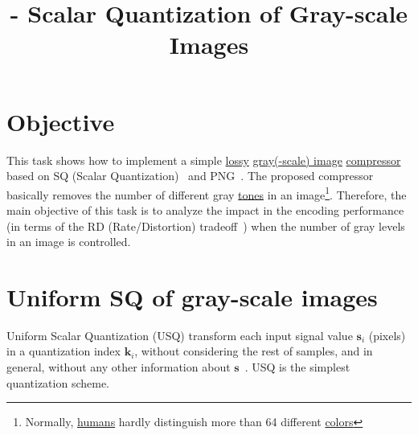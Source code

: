 

\title{\SM{} - Scalar Quantization of Gray-scale Images}

\maketitle
\tableofcontents

\section{Objective}
This task shows how to implement a simple
\href{https://en.wikipedia.org/wiki/Lossy_compression}{lossy}
\href{https://en.wikipedia.org/wiki/Grayscale}{gray(-scale) image}
\href{https://en.wikipedia.org/wiki/Image_compression}{compressor}~\cite{vruiz__image_IO}
based on SQ (Scalar
Quantization)~\cite{vruiz__scalar_quantization,sayood2017introduction,vetterli2014foundations}
and PNG~\cite{vruiz__PNG}. The proposed compressor basically removes
the number of different gray
\href{https://en.wikipedia.org/w/index.php?title=Tone_(color)&redirect=no}{tones}
in an image\footnote{Normally,
\href{https://en.wikipedia.org/wiki/Visual_system}{humans} hardly
distinguish more than 64 different
\href{https://en.wikipedia.org/wiki/Color}{colors}}. Therefore, the
main objective of this task is to analyze the impact in the encoding
performance (in terms of the RD (Rate/Distortion)
tradeoff~\cite{vruiz__information_theory}) when the number of gray
levels in an image is controlled.

\section{Uniform SQ of gray-scale images}
Uniform Scalar Quantization (USQ) transform each input signal value
$\mathbf{s}_i$ (pixels) in a quantization index $\mathbf{k}_i$,
without considering the rest of samples, and in general, without any
other information about
$\mathbf{s}$~\cite{vruiz__scalar_quantization}. USQ is the simplest
quantization scheme.

